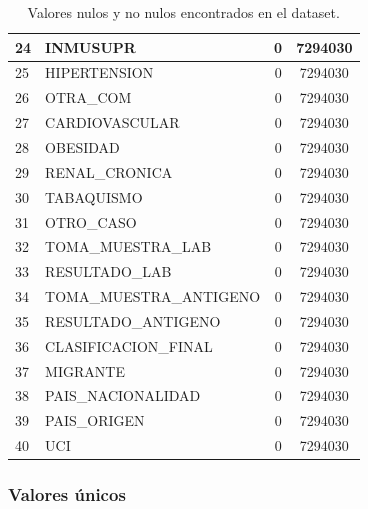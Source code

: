 \begin{table}[h]
{\begin{tabular}{|l|l|c|c|}
24 & INMUSUPR                & 0 & 7294030 \\ \hline
25 & HIPERTENSION            & 0 & 7294030 \\ \hline
26 & OTRA\_COM               & 0 & 7294030 \\ \hline
27 & CARDIOVASCULAR          & 0 & 7294030 \\ \hline
28 & OBESIDAD                & 0 & 7294030 \\ \hline
29 & RENAL\_CRONICA          & 0 & 7294030 \\ \hline
30 & TABAQUISMO              & 0 & 7294030 \\ \hline
31 & OTRO\_CASO              & 0 & 7294030 \\ \hline
32 & TOMA\_MUESTRA\_LAB      & 0 & 7294030 \\ \hline
33 & RESULTADO\_LAB          & 0 & 7294030 \\ \hline
34 & TOMA\_MUESTRA\_ANTIGENO & 0 & 7294030 \\ \hline
35 & RESULTADO\_ANTIGENO     & 0 & 7294030 \\ \hline
36 & CLASIFICACION\_FINAL    & 0 & 7294030 \\ \hline
37 & MIGRANTE                & 0 & 7294030 \\ \hline
38 & PAIS\_NACIONALIDAD      & 0 & 7294030 \\ \hline
39 & PAIS\_ORIGEN            & 0 & 7294030 \\ \hline
40 & UCI                     & 0 & 7294030 \\ \hline
\end{tabular}
}
\caption{Valores nulos y no nulos encontrados en el dataset.}
\label{tabla:autores}
\end{table}

\clearpage
\subsubsection{Valores únicos}

